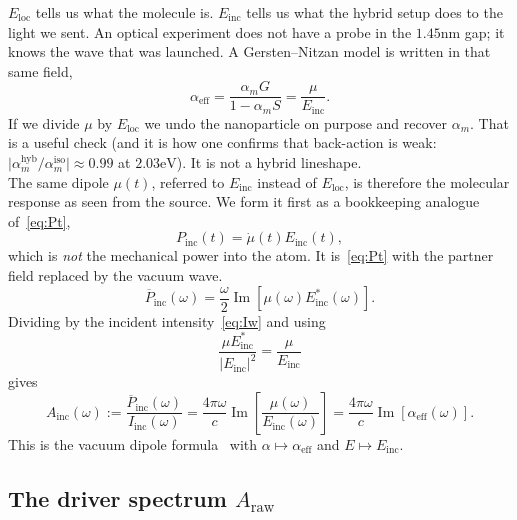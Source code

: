 \documentclass[11pt,a4paper]{article}
\newcommand{\Einc}{E_{\mathrm{inc}}}
\newcommand{\Eloc}{E_{\mathrm{loc}}}
\newcommand{\om}{\omega}
\newcommand{\alpm}{\alpha_m}
\newcommand{\alpeff}{\alpha_{\mathrm{eff}}}
\newcommand{\Araw}{A_{\mathrm{raw}}}
\newcommand{\Ainc}{A_{\mathrm{inc}}}
\newcommand{\im}[1]{\operatorname{Im}[#1]}
\begin{document}
\noindent
$\Eloc$ tells us what the molecule is.
$\Einc$ tells us what the hybrid setup does to the light we sent.
An optical experiment does not have a probe in the $1.45\mathrm{nm}$ gap; it knows the wave that was launched.
A Gersten--Nitzan model is written in that same field,
\begin{equation}
  \alpeff
  =
  \frac{\alpm G}{1-\alpm S}
  =
  \frac{\mu}{\Einc}.
  \label{eq:GN}
\end{equation}
If we divide $\mu$ by $\Eloc$ we undo the nanoparticle on purpose and recover $\alpm$.
That is a useful check (and it is how one confirms that back-action is weak: $\lvert\alpm^{\mathrm{hyb}}/\alpm^{\mathrm{iso}}\rvert\approx 0.99$ at $2.03\mathrm{eV}$).
It is not a hybrid lineshape.\\

\noindent
The same dipole $\mu(t)$, referred to $\Einc$ instead of $\Eloc$, is therefore the molecular response as seen from the source.
We form it first as a bookkeeping analogue of~\eqref{eq:Pt},
\begin{equation}
  P_{\mathrm{inc}}(t)
  =
  \dot{\mu}(t)\Einc(t),
  \label{eq:Pinc-t}
\end{equation}
which is \emph{not} the mechanical power into the atom.
It is~\eqref{eq:Pt} with the partner field replaced by the vacuum wave.
\begin{equation}
  \overline{P}_{\mathrm{inc}}(\om)
  =
  \frac{\om}{2}
  \im{\mu(\om)\Einc^{\ast}(\om)}.
  \label{eq:Pinc}
\end{equation}
Dividing by the incident intensity~\eqref{eq:Iw} and using
\begin{equation}
  \frac{\mu\Einc^{\ast}}{\lvert\Einc\rvert^{2}}
  =
  \frac{\mu}{\Einc}
  \label{eq:ratio-id}
\end{equation}
gives
\begin{equation}
  \Ainc(\om)
  :=
  \frac{\overline{P}_{\mathrm{inc}}(\om)}{I_{\mathrm{inc}}(\om)}
  =
  \frac{4\pi\om}{c}
  \im{\frac{\mu(\om)}{\Einc(\om)}}
  =
  \frac{4\pi\om}{c}
  \im{\alpeff(\om)}.
  \label{eq:Ainc}
\end{equation}
This is the vacuum dipole formula~\cite{jackson1999} with $\alpha\mapsto\alpeff$ and $E\mapsto\Einc$.

\subsection{\texorpdfstring{The driver spectrum $\Araw$}{The driver spectrum A\_raw}}
\label{sec:Araw}
\end{document}
